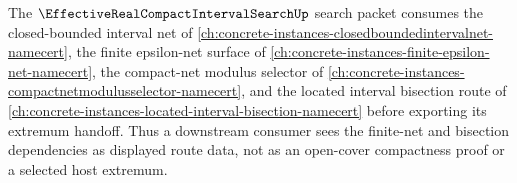 The $\EffectiveRealCompactIntervalSearchUp$ search packet consumes the closed-bounded interval net of \autoref{ch:concrete-instances-closedboundedintervalnet-namecert}, the finite epsilon-net surface of \autoref{ch:concrete-instances-finite-epsilon-net-namecert}, the compact-net modulus selector of \autoref{ch:concrete-instances-compactnetmodulusselector-namecert}, and the located interval bisection route of \autoref{ch:concrete-instances-located-interval-bisection-namecert} before exporting its extremum handoff. Thus a downstream consumer sees the finite-net and bisection dependencies as displayed route data, not as an open-cover compactness proof or a selected host extremum.
